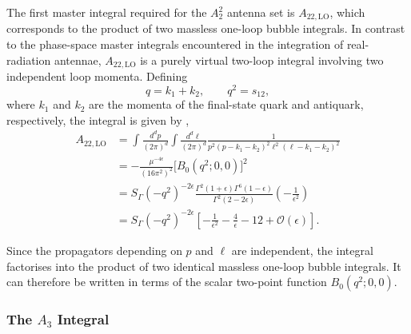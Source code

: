 The first master integral required for the $A_2^2$ antenna set is $A_{22,\mathrm{LO}}$, which corresponds
to the product of two massless one-loop bubble integrals. In contrast to the phase-space master
integrals encountered in the integration of real-radiation antennae, $A_{22,\mathrm{LO}}$ is a purely
virtual two-loop integral involving two independent loop momenta. Defining
\begin{equation*}
    q=k_1+k_2,\qquad q^2=s_{12},
\end{equation*}
where $k_1$ and $k_2$ are the momenta of the final-state quark and antiquark, respectively, the
integral is given by \cite{Gehrmann-DeRidder:2005btv},
\begin{equation}
    \begin{split}
        A_{22,\text{LO}} &= \int\frac{d^dp}{(2\pi)^d}\int\frac{d^d\ell}{(2\pi)^d}\frac1{p^2(p-k_1-k_2)^2\ell^2(\ell-k_1-k_2)^2}\\
                         &= -\frac{\mu^{-4\epsilon}}{\left(16\pi^2\right)^2}\Big[B_0\!\left(q^2;0,0\right)\Big]^2\\
                         &= S_\Gamma\!\left(-q^2\right)^{-2\epsilon}\frac{\Gamma^2(1+\epsilon)\Gamma^6(1-\epsilon)}{\Gamma^2(2-2\epsilon)}\!\left(-\frac1{\epsilon^2}\right)\\
                         &= S_\Gamma\!\left(-q^2\right)^{-2\epsilon}\!\left[-\frac1{\epsilon^2}-\frac4\epsilon-12+\mathcal O(\epsilon)\right].
    \end{split}
\end{equation}

Since the propagators depending on $p$ and $\ell$ are independent, the integral factorises into the
product of two identical massless one-loop bubble integrals. It can therefore be written in terms of
the scalar two-point function $B_0(q^2;0,0)$.

\subsubsection*{The $A_3$ Integral}

